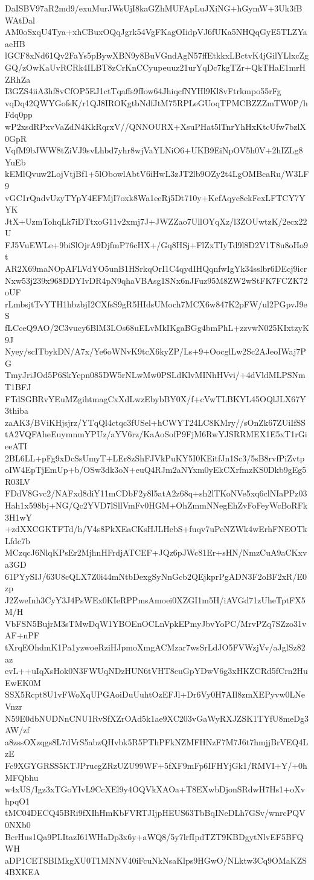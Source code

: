 DaISBV97aR2md9/exuMurJWsUjI8kaGZhMUFApLuJXiNG+hGymW+3Uk3fBWAtDal
AM0oSxqU4Tya+xhCBuxOQqJgrk54VgFKagOIidpVJ6fUKa5NHQqGyE5TLZYaaeHB
lGCF8xNd61Qv2FaYs5pBywXBN9y8BuVGndAgN57ffEtkkxLBctvK4jGilYLlxcZg
GQ/zOwKaUvRCRk4ILBT8zCrKnCCyupeuuz21urYqDc7kgTZr+QkTHaE1mrHZRhZa
I3GZS4iiA3hf8vCfOP5EJ1ctTqaffs9fIow64JhiqcfNYHl9Kl8vFtrkmpo55rFg
vqDq42QWYGofsK/r1QJ8IROKgtbNdfJtM75RPLeGUoqTPMCBZZZmTW0P/hFdq0pp
wP2xsdRPxvVaZdN4KkRqrxV//QNNOURX+XsuPHat5lTnrYhHxKtcUfw7bzlX0GpR
VqfM9bJWW8tZiVJ9svLhbd7yhr8wjVaYLNiO6+UKB9EiNpOV5h0V+2hIZLg8YuEb
kEMlQvuw2LojVtjBf1+5lObowlAbtV6iHwL3zJT2lb9OZy2t4LgOMBcaRu/W3LF9
vGC1rQndvUzyTYpY4EFMjI7oxk8Wa1eeRj5Dt710y+KefAqyc8ekFexLFTCY7YYK
JtX+UzmTohqLk7iDTtxoG11v2xmj7J+JWZZao7UllOYqXz/l3ZOUwtzK/2ecx22U
FJ5VuEWLe+9biSlOjrA9DjfmP76cHX+/Gq8HSj+FlZxTIyTd9l8D2V1T8u8oHo9t
AR2X69maNOpAFLVdYO5unB1HSrkqOrI1C4qydIHQqnfwIgYk34sslbr6DEcj9icr
Nxw53j239x968DDYIvDR4pN9qhaVBAsg1SNx6nJFuz95M8ZW2wStFK7FCZK72oUF
rLmbsjtTvYTH1hbzbjI2CXfsS9gR5HIdsUMoch7MCX6w847K2pFW/ul2PGpvJ9eS
fLCceQ9AO/2C3vucy6BlM3LOs68uELvMkIKgaBGg4bmPhL+zzvwN025KIxtzyK9J
Nyey/scITbykDN/A7x/Ye6oWNvK9tcX6kyZP/Ls+9+OocglLw2Sc2AJeoIWaj7PG
TmyJriJOd5P6SkYepn085DW5rNLwMw0PSLdKlvMINhHVvi/+4dVldMLPSNmT1BFJ
FTdSGBRvYEuMZgihtmagCxXdLwzEbybBY0X/f+cVwTLBKYL45OQlJLX67Y3thiba
zaAK3/BViKHjsjrz/YTqQl4ctqc3fUSel+hCWYT24LC8KMry//sOnZk67ZUiIfSS
tA2VQFAheEuymnmYPUz/aYV6rz/KaAoSofP9FjM6RwYJSRRMEX1E5xT1rGieeATI
2BL6LL+pFg9xDcSsUmyT+LEr8zShFJVkPuKY5I0KEitfJn1Sc3/5sB8rvfPiZvtp
oIW4EpTjEmUp+b/OSw3dk3oN+euQ4RJm2aNYxm0yEkCXrfmzKS0Dkb9gEg5R03LV
FDdV8Gvc2/NAFxd8diY11mCDbF2y8l5atA2z68q+sh2lTKoNVe5xq6clNIaPPz03
Hah1x598bj+NG/Qc2YVD7lSllVmFv0HGM+OhZmmNNegEhZvFoFeyWcBoRFk3H1wY
+zdXXCGKTFTd/h/V4s8PkXEaCKsHJLHebS+fuqv7uPeNZWk4wErhFNEOTkLfdc7b
MCzqcJ6NlqKPsEr2MjhnHFrdjATCEF+JQz6pJWc81Er+sHN/NmzCuA9aCKxva3GD
61PYySIJ/63U8cQLX7Z0i44mNtbDexgSyNnGcb2QEjkprPgADN3F2oBF2xR/E0zp
J2ZweInh3CyY3J4PsWEx0KIeRPPmsAmoei0XZGI1m5H/iAVGd71zUheTptFX5M/H
VbFSN5BujrM3sTMwDqW1YBOEnOCLnVpkEPmyJbvYoPC/MrvPZq7SZzo31vAF+nPF
tXrqEOhdmK1Pa1yzwoeRziHJpmoXmgACMzar7wsSrLdJO5FVWzjVv/aJglSz82az
evL++uIqXsHok0N3FWUqNDzHUN6tVHT8cuGpYDwV6g3xHKZCRd5fCrn2HuEwEK0M
SSX5Rcpt8U1vFWoXqUPGAoiDuUuhtOzEFJl+Dr6Vy0H7AIl8zmXEPyvw0LNeVnzr
N59E0dbNUDNnCNU1RvSfXZrOAd5k1ae9XC203vGaWyRXJZSK1TYfU8meDg3AW/zf
a8zssOXzqgs8L7dVrS5abzQHvbk5R5PThPFkNZMFHNzF7M7J6t7hmjjBrVEQ4LzE
Fc9XGYGRSS5KTJPrucgZRzUZU99WF+5fXF9mFp6IFHYjGk1/RMVI+Y/+0hMFQbhu
w4xUS/Igz3xTGoYIvL9CcXEl9y4OQVkXAOa+T8EXwbDjonSRdwH7Hs1+oXvhpqO1
tMC04DECQ45BRi9fXIhHmKbFVRTJIjpHEUS63TbBqINeDLh7GSv/wnrcPQV0NXb0
BcrHus1Qa9PLItazI61WHaDp3x6y+aWQ8/5y7lrfIpdTZT9KBDgytNlvEF5BFQWH
aDP1CETSBIMkgXU0T1MNNV40iFcuNkNsaKlps9HGwO/NLktw3Cq9OMaKZS4BXKEA
